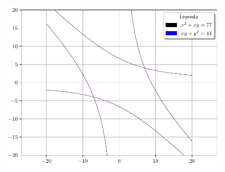 \begin{frame}
	\begin{solution}
		\begin{figure}[ht!]
			\centering
			\includegraphics[width=0.5\paperwidth]{p2}
		\end{figure}
	\end{solution}
\end{frame}